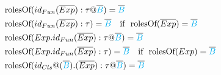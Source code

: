 \documentclass[11pt]{jarticle}
\begin{document}
\begin{alignat*}{2}
  &&&\text{rolesOf}(id_{Fun}(\overline{Exp}):\tau @ \overline{\color{cyan}B}) = \overline{\color{cyan}B}\\
  &&&\text{rolesOf}(id_{Fun}(\overline{Exp}):\tau) = \overline{\color{cyan}B}~~~\text{if}~~\text{rolesOf}(\overline{Exp})=\overline{\color{cyan}B}\\
  &&&\text{rolesOf}(Exp.id_{Fun}(\overline{Exp}):\tau @ \overline{\color{cyan}B}) = \overline{\color{cyan}B}\\
  &&&\text{rolesOf}(Exp.id_{Fun}(\overline{Exp}):\tau) = \overline{\color{cyan}B}~~~\text{if}~~\text{rolesOf}(Exp)=\overline{\color{cyan}B}\\
  &&&\text{rolesOf}(id_{Cls}@(\overline{\color{cyan}B}).(\overline{Exp}):\tau @ \overline{\color{cyan}B}) = \overline{\color{cyan}B}\\
\end{alignat*}
\end{document}
